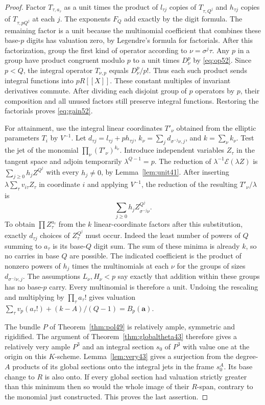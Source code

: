 \documentclass[a4paper,11pt]{article}
\theoremstyle{definition}
\theoremstyle{remark}
\numberwithin{equation}{section}
\begin{document}
\begin{proof}
Factor \(T_{\tau,a_\tau}\) as a unit times the product of
\(l_{\tau j}\) copies of \(T_{\tau,Q^j}\) and \(h_{\tau j}\)
copies of \(T_{\tau,pQ^j}\) at each \(j\). The exponents \(F_Q\)
add exactly by the digit formula. The remaining factor is a unit
because the multinomial coefficient that combines these base-\(p\)
digits has valuation zero, by Legendre's formula for factorials.
After this factorization, group the first kind of operator according
to \(\nu=\sigma^j\tau\). Any \(p\) in a group have product congruent
modulo \(p\) to a unit times \(D_\nu^p\) by \eqref{eq:op52}.
Since \(p<Q\), the integral operator \(T_{\nu,p}\) equals
\(D_\nu^p/p!\). Thus each such product sends integral functions
into \(pR[[X]]\). These constant multiples of invariant derivatives
commute. After dividing each disjoint group of \(p\) operators by \(p\),
their composition and all unused factors still preserve integral
functions. Restoring the factorials proves \eqref{eq:gain52}.

For attainment, use the integral linear coordinates \(T'_\nu\)
obtained from the elliptic parameters \(T_i\) by \(V^{-1}\).
Let \(d_{\tau j}=l_{\tau j}+p h_{\tau j}\),
\(k_\nu=\sum_j d_{\sigma^{-j}\nu,j}\), and \(k=\sum_\nu k_\nu\).
Test the jet of the monomial \(\prod_\nu(T'_\nu)^{k_\nu}\).
Introduce independent variables \(Z_\tau\) in the tangent space and
adjoin temporarily \(\lambda^{Q-1}=p\). The reduction of
\(\lambda^{-1}\mathcal E(\lambda Z)\) is
\(\sum_{j\ge0}h_j Z^{Q^j}\) with every \(h_j\ne0\), by
Lemma~\ref{lem:unit41}. After inserting
\(\lambda\sum_\tau v_{i\tau} Z_\tau\) in coordinate \(i\) and applying
\(V^{-1}\), the reduction of the resulting \(T'_\nu/\lambda\) is
\[
                \sum_{j\ge0} h_j Z_{\sigma^{-j}\nu}^{Q^j}.
\]
To obtain \(\prod Z_\tau^{a_\tau}\) from the \(k\) linear-coordinate
factors after this substitution, exactly \(d_{\tau j}\) choices of
\(Z_\tau^{Q^j}\) must occur. Indeed the least number of powers of
\(Q\) summing to \(a_\tau\) is its base-\(Q\) digit sum. The sum of
these minima is already \(k\), so no carries in base \(Q\) are possible.
The indicated coefficient is the product of nonzero powers of \(h_j\)
times the multinomials at each \(\nu\) for the groups of sizes
\(d_{\sigma^{-j}\nu,j}\). The assumptions \(L_\nu,H_\nu<p\) say
exactly that addition within these groups has no base-\(p\) carry.
Every multinomial is therefore a unit. Undoing the rescaling and
multiplying by \(\prod_\tau a_\tau!\) gives valuation
\(\sum_\tau v_p(a_\tau!)+(k-A)/(Q-1)=B_p(\boldsymbol a)\).

The bundle \(P\) of Theorem~\ref{thm:pol49} is relatively ample,
symmetric and rigidified. The argument of Theorem~\ref{thm:globaltheta43}
therefore gives a relatively very ample \(P^3\) and an integral
section \(s_0\) of \(P^3\) with value one at the origin on this
\(K\)-scheme. Lemma~\ref{lem:very43} gives a surjection from the
degree-\(A\) products of its global sections onto the integral jets
in the frame \(s_0^A\). Its
base change to \(R\) is also onto. If every global section had
valuation strictly greater than this minimum then so would the
whole image of their \(R\)-span, contrary to the monomial just
constructed. This proves the last assertion.
\end{proof}
\end{document}
